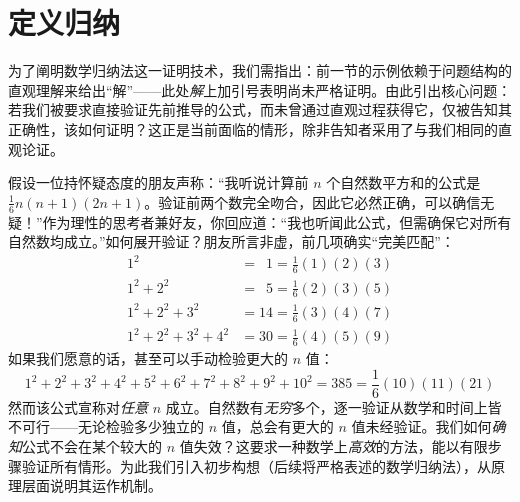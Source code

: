 \section{定义归纳}

为了阐明数学归纳法这一证明技术，我们需指出：前一节的示例依赖于问题结构的直观理解来给出``解''——此处\emph{解}上加引号表明尚未严格证明。由此引出核心问题：若我们被要求直接验证先前推导的公式，而未曾通过直观过程获得它，仅被告知其正确性，该如何证明？这正是当前面临的情形，除非告知者采用了与我们相同的直观论证。

假设一位持怀疑态度的朋友声称：``我听说计算前 $n$ 个自然数平方和的公式是 $\frac{1}{6}n(n+1)(2n+1)$。验证前两个数完全吻合，因此它必然正确，可以确信无疑！''作为理性的思考者兼好友，你回应道：``我也听闻此公式，但需确保它对所有自然数均成立。''如何展开验证？朋友所言非虚，前几项确实``完美匹配''：
\begin{align*}
    1^2 &= \enspace 1 = \frac{1}{6}(1)(2)(3) \\
    1^2 + 2^2 &= \enspace 5 = \frac{1}{6}(2)(3)(5) \\
    1^2 + 2^2 + 3^2 &= 14 = \frac{1}{6}(3)(4)(7) \\
    1^2 + 2^2 + 3^2 + 4^2 &= 30 = \frac{1}{6}(4)(5)(9)
\end{align*}
如果我们愿意的话，甚至可以手动检验更大的 $n$ 值：
\[1^2 + 2^2 + 3^2 + 4^2 + 5^2 + 6^2 + 7^2 + 8^2 + 9^2 + 10^2 = 385 = \frac{1}{6}(10)(11)(21)\]
然而该公式宣称对\emph{任意} $n$ 成立。自然数有\emph{无穷}多个，逐一验证从数学和时间上皆不可行——无论检验多少独立的 $n$ 值，总会有更大的 $n$ 值未经验证。我们如何\emph{确知}公式不会在某个较大的 $n$ 值失效？这要求一种数学上\emph{高效}的方法，能以有限步骤验证所有情形。为此我们引入初步构想（后续将严格表述的数学归纳法），从原理层面说明其运作机制。








